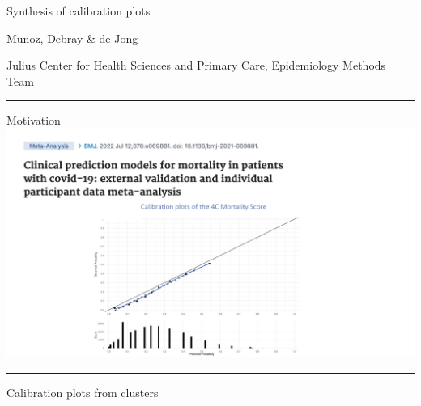 \documentclass[
  letterpaper,
  DIV=11,
  numbers=noendperiod]{scrartcl}
\author{}
\date{}
\begin{document}
\ifdefined\Shaded\renewenvironment{Shaded}{\begin{tcolorbox}[interior hidden, frame hidden, borderline west={3pt}{0pt}{shadecolor}, sharp corners, breakable, enhanced, boxrule=0pt]}{\end{tcolorbox}}\fi

{Synthesis of calibration plots}

{Munoz, Debray \& de Jong}

Julius Center for Health Sciences and Primary Care, Epidemiology Methods
Team

\begin{center}\rule{0.5\linewidth}{0.5pt}\end{center}

{ Motivation} \includegraphics{images/F1.png}

\begin{center}\rule{0.5\linewidth}{0.5pt}\end{center}

{ Calibration plots from clusters}
\end{document}
